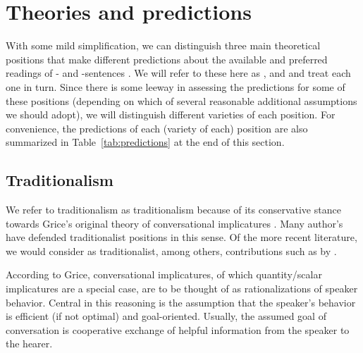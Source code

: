 \documentclass[fleqn,reqno,10pt,draft]{article}
\newcommand{\as}{\acro{as}}
\renewcommand{\es}{\acro{es}}
\begin{document}
\section{Theories and predictions}
\label{sec:theories-predictions}

With some mild simplification, we can distinguish three main
theoretical positions that make different predictions about the
available and preferred readings of \as- and \es-sentences
\citep[c.f.][for
overview]{Horn2006:The-Border-Wars,Geurts2010:Quantity-Implic,Sauerland2012:The-Computation}. We
will refer to these here as ,
 and  and treat each
one in turn. Since there is some leeway in assessing the predictions
for some of these positions (depending on which of several reasonable
additional assumptions we should adopt), we will distinguish different
varieties of each position. For convenience, the predictions of each
(variety of each) position are also summarized in
Table~\ref{tab:predictions} at the end of this section.

\subsection{Traditionalism}
\label{sec:traditionalism}

We refer to traditionalism as traditionalism because of its
conservative stance towards Grice's original theory of conversational
implicatures \citep{Grice1975:Logic-and-Conve}. Many author's have
defended traditionalist positions in this sense. Of the more recent
literature, we would consider as traditionalist, among others,
contributions such as by
\citet{Spector2006:Scalar-Implicat,Sauerland2004:Scalar-Implicat,Russell2006:Against-Grammat,vanRooijSchulz:ExhaustiveInterpretation,Geurts2010:Quantity-Implic,Franke2011:Quantity-Implic}. 

 According to Grice,
conversational implicatures, of which quantity/scalar implicatures are
a special case, are to be thought of as rationalizations of speaker
behavior. Central in this reasoning is the assumption that the
speaker's behavior is efficient (if not optimal) and
goal-oriented. Usually, the assumed goal of conversation is
cooperative exchange of helpful information from the speaker to the
hearer.
\end{document}
